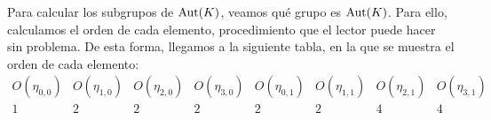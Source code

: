 \begin{ejemplo}
    Para calcular los subgrupos de $\operatorname{Aut}(K)$, veamos qué grupo es $\operatorname{Aut}(K)$. Para ello, calculamos el orden de cada elemento, procedimiento que el lector puede hacer sin problema. De esta forma, llegamos a la siguiente tabla, en la que se muestra el orden de cada elemento:
    \begin{equation*}
        \begin{array}{cccccccc}
            O(\eta_{0,0}) &  O(\eta_{1,0}) & O(\eta_{2,0}) & O(\eta_{3,0}) & O(\eta_{0,1}) & O(\eta_{1,1}) & O(\eta_{2,1}) & O(\eta_{3,1}) \\ \hline
            1 & 2 & 2 & 2 & 2 & 2 & 4 & 4
        \end{array}
    \end{equation*}


\end{ejemplo}
